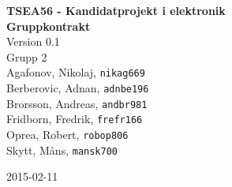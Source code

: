 \documentclass[11pt]{article}
\date{}
\begin{document}
\begin{titlepage}
\begin{center}
{\Large\bfseries TSEA56 - Kandidatprojekt i elektronik \\ Gruppkontrakt}\\
%
\vspace{2\baselineskip}
%
Version 0.1\\
\vspace{2\baselineskip}
%
Grupp 2 \\
Agafonov, Nikolaj, 
\texttt{nikag669}
\\
Berberovic, Adnan, 
\texttt{adnbe196}
\\
Brorsson, Andreas, 
\texttt{andbr981}
\\
Fridborn, Fredrik, 
\texttt{frefr166}
\\
Oprea, Robert, 
\texttt{robop806}
\\
Skytt, Måns, 
\texttt{mansk700}

\vspace{2\baselineskip}
2015-02-11


\end{center}
\end{titlepage}



\pagebreak

\end{document}
